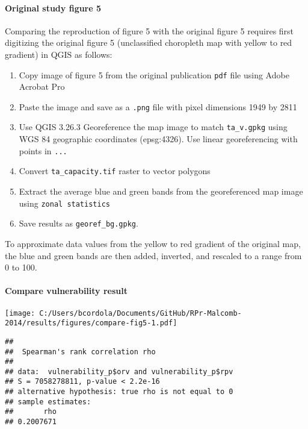 \documentclass[
]{article}
\providecommand{\tightlist}{%
  \setlength{\itemsep}{0pt}\setlength{\parskip}{0pt}}
\begin{document}
\hypertarget{original-study-figure-5}{%
\paragraph{Original study figure 5}\label{original-study-figure-5}}

Comparing the reproduction of figure 5 with the original figure 5
requires first digitizing the original figure 5 (unclassified choropleth
map with yellow to red gradient) in QGIS as follows:

\begin{enumerate}
\def\labelenumi{\arabic{enumi}.}
\tightlist
\item
  Copy image of figure 5 from the original publication \texttt{pdf} file
  using Adobe Acrobat Pro
\item
  Paste the image and save as a \texttt{.png} file with pixel dimensions
  1949 by 2811
\item
  Use QGIS 3.26.3 Georeference the map image to match
  \texttt{ta\_v.gpkg} using WGS 84 geographic coordinates (epsg:4326).
  Use linear georeferencing with points in \texttt{...}
\item
  Convert \texttt{ta\_capacity.tif} raster to vector polygons
\item
  Extract the average blue and green bands from the georeferenced map
  image using \texttt{zonal\ statistics}
\item
  Save results as \texttt{georef\_bg.gpkg}.
\end{enumerate}

To approximate data values from the yellow to red gradient of the
original map, the blue and green bands are then added, inverted, and
rescaled to a range from 0 to 100.

\hypertarget{compare-vulnerability-result}{%
\paragraph{Compare vulnerability
result}\label{compare-vulnerability-result}}

\texttt{[image: C:/Users/bcordola/Documents/GitHub/RPr-Malcomb-2014/results/figures/compare-fig5-1.pdf]}

\begin{verbatim}
## 
##  Spearman's rank correlation rho
## 
## data:  vulnerability_p$orv and vulnerability_p$rpv
## S = 7058278811, p-value < 2.2e-16
## alternative hypothesis: true rho is not equal to 0
## sample estimates:
##       rho 
## 0.2007671
\end{verbatim}
\end{document}
